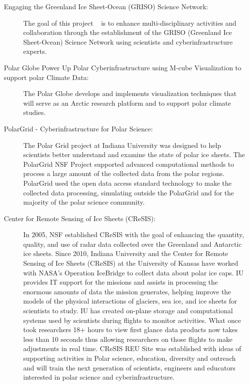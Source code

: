 \documentclass[10pt,letterpaper,draft]{article}
\begin{document}
\begin{description}
\item [Engaging the Greenland Ice Sheet-Ocean (GRISO) Science Network:]

The goal of this project ~\cite{Aboab2016-tk} is to enhance multi-disciplinary activities and collaboration through the establishment of the GRISO (Greenland Ice Sheet-Ocean) Science Network using scientists and cyberinfrastructure experts.

\item [Polar Globe Power Up Polar Cyberinfrastructure using M-cube Visualization to support polar Climate Data:]
 The Polar Globe \cite{major_league} develops and implements visualization techniques that will serve as an Arctic research platform and to support polar climate studies.
 
 \item[PolarGrid - Cyberinfrastructure for Polar Science:]
  The Polar Grid project at Indiana University was designed to help scientists better understand and examine the state of polar ice sheets. The PolarGrid NSF Project supported advanced computational methods to process a large amount of the collected data from the polar regions. PolarGrid used the open data access standard technology to make the collected data processing, simulating outside the PolarGrid and for the majority of the polar science community.

\item[Center for Remote Sensing of Ice Sheets (CReSIS):] In 2005, NSF established CReSIS  with the goal of enhancing the quantity, quality, and use of radar data collected over the Greenland and Antarctic ice sheets. Since 2010, Indiana University and the Center for Remote Sensing of Ice Sheets (CReSIS) at the University of Kansas have worked with NASA's Operation IceBridge to collect data about polar ice caps. IU provides IT support for the missions and assists in processing the enormous amounts of data the mission generates, helping improve the models of the physical interactions of glaciers, sea ice, and ice sheets for scientists to study. IU has created on-plane storage and computational systems used by scientists during flights to monitor activities. What once took researchers 18+ hours to view first glance data products now takes less than 10 seconds thus allowing researchers on those flights to make adjustments in real time.   CReSIS REU Site was established with ideas of supporting activities in Polar science, education, diversity and outreach and will train the next generation of scientists, engineers and educators interested in polar science and cyberinfrastructure.


\end{description}
\end{document}
